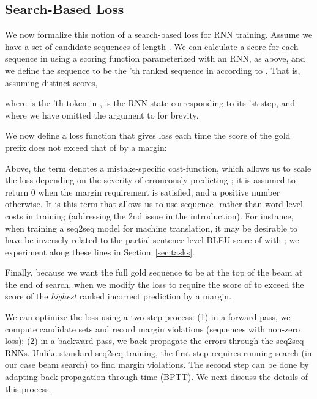 \documentclass[11pt,letterpaper]{article}
\begin{document}
\subsection{Search-Based Loss}
We now formalize this notion of a search-based loss for RNN training. Assume we have a
set  of  candidate sequences of length . We can calculate a
score for each sequence in  using a scoring function 
parameterized with an RNN, as above, and we define the
sequence  to be the 'th
ranked sequence in  according to . That is, assuming
distinct scores, 

where  is the 'th token in ,
 is the RNN state corresponding to its
'st step, and where we have omitted the  argument to  for brevity. 

We now define a loss function that gives loss each time the score of
the gold prefix  does not exceed that of
 by a margin:

Above, the  term denotes a
mistake-specific cost-function, which allows us to scale the loss
depending on the severity of erroneously predicting ;
it is assumed to return 0 when the margin requirement is satisfied,
and a positive number otherwise. It is this term that allows us to use sequence- rather than word-level costs in training (addressing the 2nd issue in the introduction). For instance, when training a seq2seq model for machine translation, it may be desirable to have  be inversely related to the partial sentence-level BLEU score of  with ; we experiment along these lines in Section~\ref{sec:tasks}. 

Finally, because we want the full gold sequence to be at the top of the beam at the end of search, when  we modify the loss to require the score of  to exceed the score of the \textit{highest} ranked incorrect prediction by a margin.

We can optimize the loss  using a two-step process: (1) in a forward pass, we compute candidate sets  and record margin violations (sequences with non-zero loss); (2) in a backward pass, we back-propagate the errors through the seq2seq RNNs.
Unlike standard seq2seq training, the first-step requires running
search (in our case beam search) to find margin violations. The second
step can be done by adapting back-propagation through time (BPTT). 
We next discuss the details of this process.
\end{document}
